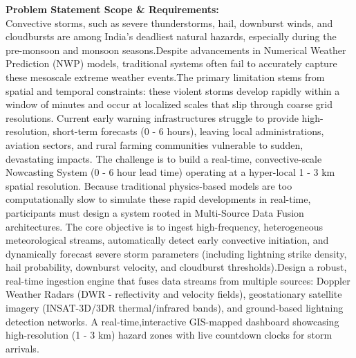 \documentclass[10pt,a4paper]{article}
\begin{document}
\begin{tcolorbox}[pscard, title={"\textbf{SIH26084} \quad $\vert$ \quad Convective scale nowcasting for Thunderstorms, Hail \& Cloudbursts (06 hr)}]
\textbf{\color{sihnavy}Problem Statement Scope \& Requirements:}\\[0.15cm]
\noindent\small Convective storms, such as severe thunderstorms, hail, downburst winds, and cloudbursts are among India's deadliest natural hazards, especially during the pre-monsoon and monsoon seasons.Despite advancements in Numerical Weather Prediction (NWP) models, traditional systems often fail to accurately capture these mesoscale extreme weather events.The primary limitation stems from spatial and temporal constraints: these violent storms develop rapidly within a window of minutes and occur at localized scales that slip through coarse grid resolutions. Current early warning infrastructures struggle to provide high-resolution, short-term forecasts (0 - 6 hours), leaving local administrations, aviation sectors, and rural farming communities vulnerable to sudden, devastating impacts. The challenge is to build a real-time, convective-scale Nowcasting System (0 - 6 hour lead time) operating at a hyper-local 1 - 3 km spatial resolution. Because traditional physics-based models are too computationally slow to simulate these rapid developments in real-time, participants must design a system rooted in Multi-Source Data Fusion architectures. The core objective is to ingest high-frequency, heterogeneous meteorological streams, automatically detect early convective initiation, and dynamically forecast severe storm parameters (including lightning strike density, hail probability, downburst velocity, and cloudburst thresholds).Design a robust, real-time ingestion engine that fuses data streams from multiple sources: Doppler Weather Radars (DWR - reflectivity and velocity fields), geostationary satellite imagery (INSAT-3D/3DR thermal/infrared bands), and ground-based lightning detection networks. A real-time,interactive GIS-mapped dashboard showcasing high-resolution (1 - 3 km) hazard zones with live countdown clocks for storm arrivals.\par\vspace{0.06cm}

\end{tcolorbox}
\vspace{0.4cm}
{}
\end{document}
